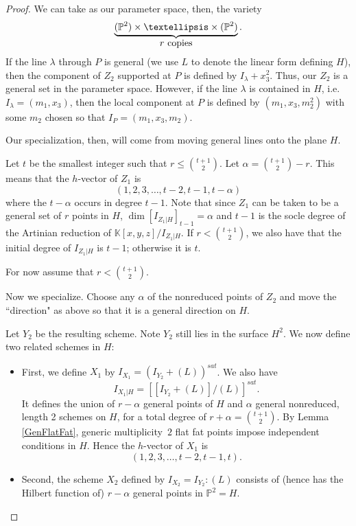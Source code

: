 \documentclass[10pt,a4paper]{amsart}
\newcommand{\PP}{ \ensuremath{\mathbb{P}}}
\begin{document}
\begin{proof}
We can take as our parameter space, then, the variety
\[
\underbrace{(\mathbb P^2) \times \dots \times  (\mathbb P^2)}_{\hbox{$r$ copies}}.
\]
If the line {$\lambda$ } through $P$ is general (we use $L$ to denote the linear form defining $H$), then the component of $Z_2$ supported at $P$ is defined by $I_\lambda + x_3^2$.
Thus, our $Z_2$ is a general set in the parameter space. 
However, if the line $\lambda$ is contained in $H$, i.e. $I_\lambda = (m_1, x_3)$, then the local component at $P$ is defined by 
$(m_1, x_3, m_2^2)$ with some $m_2$ chosen so that $I_P = (m_1, x_3, m_2)$. 

Our specialization, then, will come from moving general lines onto the plane $H$.






Let $t$ be the smallest integer such that $r \leq \binom{t+1}{2}$. Let $\alpha = \binom{t+1}{2} - r$. 
This means that the $h$-vector of $Z_1$ is
\[
(1,2,3,\dots, t-2, t-1, t-\alpha)
\]
where the $t-\alpha$ occurs in degree $t-1$. 
Note that since $Z_1$ can be taken to be a general set of $r$ points in $H$, $\dim [I_{Z_1 |H}]_{t-1} = \alpha$ and $t-1$ is the socle degree of the Artinian reduction of $\mathbb{K}[x,y,z]/I_{Z_1|H}$. If $r < \binom{t+1}{2}$, we also have that the initial degree of $I_{Z_1|H}$ is $t-1$; otherwise it is $t$.

For now assume that $r < \binom{t+1}{2}$.

Now we specialize. Choose any $\alpha$ of the nonreduced points of $Z_2$ and move the ``direction" as above so that it is a general direction on $H$. 


Let $Y_2$ be the resulting scheme. Note $Y_2$ still lies in the surface $H^2$. 
We now define two related schemes in $H$:

\begin{itemize}
    \item First, we define $X_1$ by 
    $I_{X_1} = ( I_{Y_2} + (L))^{sat}$. We also have
    \[
    I_{X_1|H} = [[I_{Y_2} + (L)]/(L)]^{sat}.
    \]
It defines the union of  $r-\alpha$ general points of $H$ and $\alpha$ general nonreduced, length 2 schemes on $H$, for a total degree of $r+\alpha = \binom{t+1}{2}$.
    By Lemma \ref{GenFlatFat}, generic multiplicity~$2$ flat fat points impose independent conditions in $H$.  Hence the $h$-vector of $X_1$ is
    \[
(1,2,3,\dots, t-2, t-1, t).
\] 


    \item Second, the scheme $X_2$ defined by $I_{X_2} = I_{Y_2} : (L)$ consists of (hence has the Hilbert function of) $r-\alpha$ general points in  $\PP^2 = H$.


\end{itemize}
\end{proof}
\end{document}
